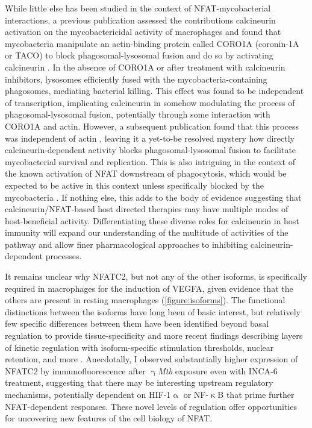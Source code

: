 While little else has been studied in the context of NFAT\hyp{}mycobacterial interactions, a previous publication assessed the contributions calcineurin activation on the mycobactericidal activity of macrophages and found that mycobacteria manipulate an actin\hyp{}binding protein called CORO1A (coronin\hyp{}1A or TACO) to block phagosomal\hyp{}lysosomal fusion and do so by activating calcineurin \citep{Jayachandran2007}. In the absence of CORO1A or after treatment with calcineurin inhibitors, lysosomes efficiently fused with the mycobacteria\hyp{}containing phagosomes, mediating bacterial killing. This effect was found to be independent of transcription, implicating calcineurin in somehow modulating the process of phagosomal\hyp{}lysosomal fusion, potentially through some interaction with CORO1A and actin. However, a subsequent publication found that this process was independent of actin \citep{Jayachandran2008}, leaving it a yet\hyp{}to\hyp{}be resolved mystery how directly calcineurin\hyp{}dependent activity blocks phagosomal\hyp{}lysosomal fusion to facilitate mycobacterial survival and replication. This is also intriguing in the context of the known activation of NFAT downstream of phagocytosis, which would be expected to be active in this context unless specifically blocked by the mycobacteria \citep{Fric2014}. If nothing else, this adds to the body of evidence suggesting that calcineurin/NFAT\hyp{}based host directed therapies may have multiple modes of host\hyp{}beneficial activity. Differentiating these diverse roles for calcineurin in host immunity will expand our understanding of the multitude of activities of the pathway and allow finer pharmacological approaches to inhibiting calcineurin-dependent processes.

It remains unclear why NFATC2, but not any of the other isoforms, is specifically required in macrophages for the induction of VEGFA, given evidence that the others are present in resting macrophages (\autoref{figure:isoforms}). The functional distinctions between the isoforms have long been of basic interest, but relatively few specific differences between them have been identified beyond basal regulation to provide tissue\hyp{}specificity and more recent findings describing layers of kinetic regulation with isoform\hyp{}specific stimulation thresholds, nuclear retention, and more \citep{Lyakh1997, Rao1997, Kar2014, Kar2015, Kar2016, Yissachar2013}. Anecdotally, I observed substantially higher expression of NFATC2 by immunofluorescence after $\upgamma$\textit{Mtb} exposure even with INCA\hyp{}6 treatment, suggesting that there may be interesting upstream regulatory mechanisms, potentially dependent on HIF\hyp{}1$\upalpha$ or NF\hyp{}$\upkappa$B that prime further NFAT-dependent responses. These novel levels of regulation offer opportunities for uncovering new features of the cell biology of NFAT.

